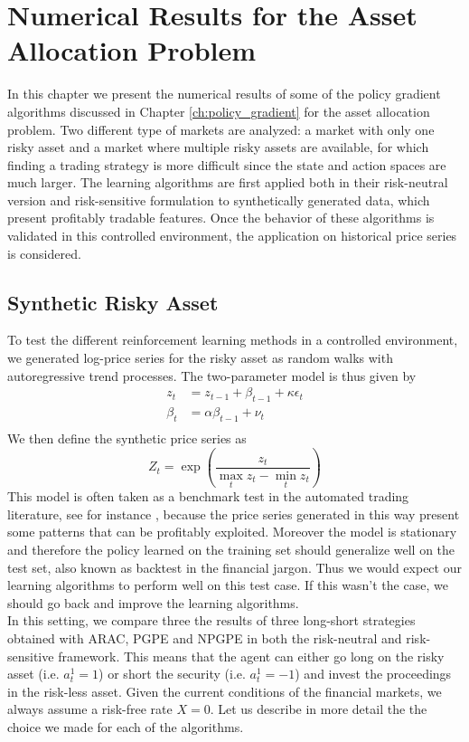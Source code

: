 \chapter{Numerical Results for the Asset Allocation Problem}
\label{ch:numerical_results}

In this chapter we present the numerical results of some of the policy gradient algorithms discussed in Chapter \ref{ch:policy_gradient} for the asset allocation problem. Two different type of markets are analyzed: a market with only one risky asset and a market where multiple risky assets are available, for which finding a trading strategy is more difficult since the state and action spaces are much larger. The learning algorithms are first applied both in their risk-neutral version and risk-sensitive formulation to synthetically generated data, which present profitably tradable features. Once the behavior of these algorithms is validated in this controlled environment, the application on historical price series is considered. 

\section{Synthetic Risky Asset}
\label{sec:synthetic_risky_asset}
To test the different reinforcement learning methods in a controlled environment, we generated log-price series for the risky asset as random walks with autoregressive trend processes. The two-parameter model is thus given by
\begin{equation*}
	\begin{split}
		z_t &= z_{t-1} + \beta_{t-1} + \kappa \epsilon_t\\
		\beta_t &= \alpha \beta_{t-1} + \nu_t\\
	\end{split}
\end{equation*}
We then define the synthetic price series as
\begin{equation*}
	Z_t = \exp\left(\frac{z_t}{\max_t z_t - \min_t z_t}\right)
\end{equation*}
This model is often taken as a benchmark test in the automated trading literature, see for instance \cite{moody1998performance}, because the price series generated in this way present some patterns that can be profitably exploited. Moreover the model is stationary and therefore the policy learned on the training set should generalize well on the test set, also known as backtest in the financial jargon. Thus we would expect our learning algorithms to perform well on this test case. If this wasn't the case, we should go back and improve the learning algorithms.\\
In this setting, we compare three the results of three long-short strategies obtained with ARAC, PGPE and NPGPE in both the risk-neutral and risk-sensitive framework. This means that the agent can either go long on the risky asset (i.e. $a_t^1 = 1$) or short the security (i.e. $a_t^1 = -1$) and invest the proceedings in the risk-less asset. Given the current conditions of the financial markets, we always assume a risk-free rate $X = 0$. Let us describe in more detail the the choice we made for each of the algorithms. 

